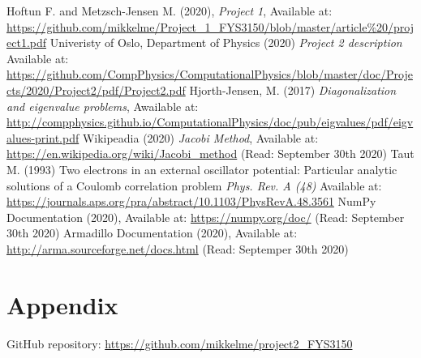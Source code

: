 \documentclass[american,a4paper,12pt]{article}
\begin{document}
\newpage
\begin{thebibliography}{}
 Hoftun F. and Metzsch-Jensen M. (2020), \textit{Project 1}, Available at: \url{https://github.com/mikkelme/Project_1_FYS3150/blob/master/article%20/project1.pdf}
 Univeristy of Oslo, Department of Physics (2020) \textit{Project 2 description} Available at: \url{https://github.com/CompPhysics/ComputationalPhysics/blob/master/doc/Projects/2020/Project2/pdf/Project2.pdf}
 Hjorth-Jensen, M. (2017) \textit{Diagonalization and eigenvalue problems}, Awailable at: \url{http://compphysics.github.io/ComputationalPhysics/doc/pub/eigvalues/pdf/eigvalues-print.pdf}
 Wikipeadia (2020) \textit{Jacobi Method}, Available at: \url{https://en.wikipedia.org/wiki/Jacobi_method} (Read: September 30th 2020)
 Taut M. (1993) {Two electrons in an external oscillator potential: Particular analytic solutions of a Coulomb correlation problem} \textit{Phys. Rev. A (48)} Available at: \url{https://journals.aps.org/pra/abstract/10.1103/PhysRevA.48.3561}
 NumPy Documentation (2020), Available at: \url{https://numpy.org/doc/} (Read: September 30th 2020)
 Armadillo Documentation (2020), Available at: \url{http://arma.sourceforge.net/docs.html} (Read: Septemper 30th 2020)
\end{thebibliography}

\newpage
\section*{Appendix}
GitHub repository: \url{https://github.com/mikkelme/project2_FYS3150}
\end{document}
